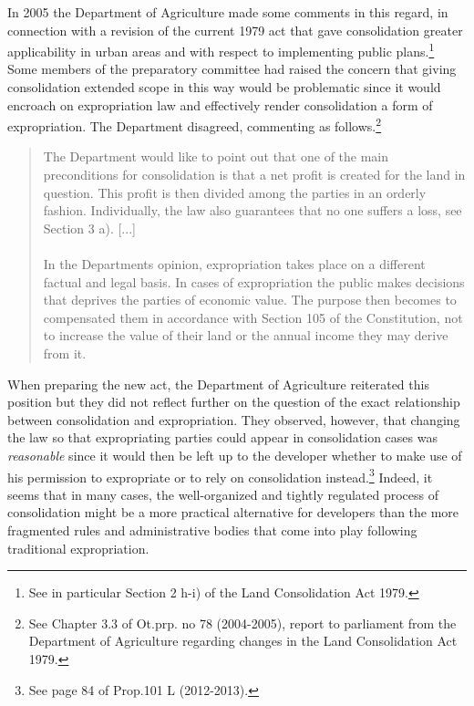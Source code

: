 In 2005 the Department of Agriculture made some comments in this regard, in connection with a revision of the current 1979 act that gave consolidation greater applicability in urban areas and with respect to implementing public plans.\footnote{See in particular Section 2 h-i) of the Land Consolidation Act 1979.} Some members of the preparatory committee had raised the concern that giving consolidation extended scope in this way would be problematic since it would encroach on expropriation law and effectively render consolidation a form of expropriation. The Department disagreed, commenting as follows.\footnote{See Chapter 3.3 of Ot.prp. no 78 (2004-2005), report to parliament from the Department of Agriculture regarding changes in the Land Consolidation Act 1979.}

\begin{quote}
The Department would like to point out that one of the main preconditions for consolidation is that a net profit is created for the land in question. This profit is then divided among the parties in an orderly fashion. Individually, the law also guarantees that no one suffers a loss, see Section 3 a). [...] \\ \\ In the Departments opinion, expropriation takes place on a different factual and legal basis. In cases of expropriation the public makes decisions that deprives the parties of economic value. The purpose then becomes to compensated them in accordance with Section 105 of the Constitution, not to increase the value of their land or the annual income they may derive from it.
\end{quote}

When preparing the new act, the Department of Agriculture reiterated this position but they did not reflect further on the question of the exact relationship between consolidation and expropriation. They observed, however, that changing the law so that expropriating parties could appear in consolidation cases was \emph{reasonable} since it would then be left up to the developer whether to make use of his permission to expropriate or to rely on consolidation instead.\footnote{See page 84 of Prop.101 L (2012-2013).} Indeed, it seems that in many cases, the well-organized and tightly regulated process of consolidation might be a more practical alternative for developers than the more fragmented rules and administrative bodies that come into play following traditional expropriation. 

